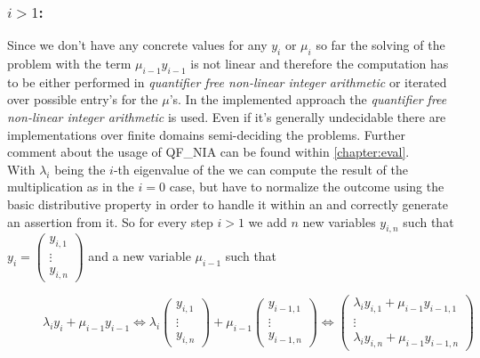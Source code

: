 \subsubsection{$i > 1$:}
Since we don't have any concrete values for any $y_i$ or $\mu_i$ so far the solving of the problem with the term $\mu_{i-1}y_{i-1}$ is not linear and therefore the computation has to be either performed in \textit{quantifier free non-linear integer arithmetic} or iterated over possible entry's for the $\mu$'s.\newline
In the implemented approach the \textit{quantifier free non-linear integer arithmetic} is used. Even if it's generally undecidable there are implementations over finite domains semi-deciding the problems. \cite{behrmann2014bit} \cite{giesl2016} \newline
Further comment about the usage of QF\_NIA can be found within \autoref{chapter:eval}.
\\
With $\lambda_i$ being the $i$-th eigenvalue of the \updatematrix we can compute the result of the multiplication as in the $i=0$ case, but have to normalize the outcome using the basic distributive property in order to handle it within an \rpntree and correctly generate an assertion from it.\newline
So for every step $i > 1$ we add $n$ new variables $y_{i,n}$ such that $y_i = \begin{pmatrix} y_{i,1} \\ \vdots \\ y_{i,n}\end{pmatrix}$ and a new variable $\mu_{i-1}$ such that 
\begin{figure}[H]
	\centering
	$\lambda_i y_i+\mu_{i-1}y_{i-1} \Leftrightarrow \lambda_i \begin{pmatrix} y_{i,1} \\ \vdots \\ y_{i,n}\end{pmatrix} + \mu_{i-1} \begin{pmatrix} y_{i-1,1} \\ \vdots \\ y_{i-1,n}\end{pmatrix} \Leftrightarrow \begin{pmatrix}
		\lambda_i y_{i,1}+\mu_{i-1}y_{i-1,1} \\ \vdots \\ \lambda_i y_{i,n}+\mu_{i-1}y_{i-1,n}
	\end{pmatrix}$ 
\end{figure}

